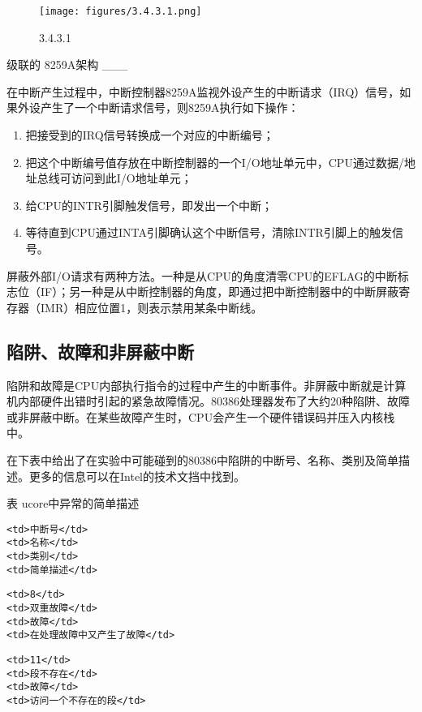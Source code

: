 \begin{figure}[htbp]
\centering
\texttt{[image: figures/3.4.3.1.png]}
\caption{3.4.3.1}
\end{figure}

级联的 8259A架构 \_\_\_

在中断产生过程中，中断控制器8259A监视外设产生的中断请求（IRQ）信号，如果外设产生了一个中断请求信号，则8259A执行如下操作：

\begin{enumerate}
\def\labelenumi{\arabic{enumi}.}
\item
  把接受到的IRQ信号转换成一个对应的中断编号；
\item
  把这个中断编号值存放在中断控制器的一个I/O地址单元中，CPU通过数据/地址总线可访问到此I/O地址单元；
\item
  给CPU的INTR引脚触发信号，即发出一个中断；
\item
  等待直到CPU通过INTA引脚确认这个中断信号，清除INTR引脚上的触发信号。
\end{enumerate}

屏蔽外部I/O请求有两种方法。一种是从CPU的角度清零CPU的EFLAG的中断标志位（IF）；另一种是从中断控制器的角度，即通过把中断控制器中的中断屏蔽寄存器（IMR）相应位置1，则表示禁用某条中断线。

\subsection{陷阱、故障和非屏蔽中断}\label{ux9677ux9631ux6545ux969cux548cux975eux5c4fux853dux4e2dux65ad}

陷阱和故障是CPU内部执行指令的过程中产生的中断事件。非屏蔽中断就是计算机内部硬件出错时引起的紧急故障情况。80386处理器发布了大约20种陷阱、故障或非屏蔽中断。在某些故障产生时，CPU会产生一个硬件错误码并压入内核栈中。

在下表中给出了在实验中可能碰到的80386中陷阱的中断号、名称、类别及简单描述。更多的信息可以在Intel的技术文挡中找到。

表 ucore中异常的简单描述

\begin{lstlisting}
<td>中断号</td>
<td>名称</td>
<td>类别</td>
<td>简单描述</td>
\end{lstlisting}

\begin{lstlisting}
<td>8</td>
<td>双重故障</td>
<td>故障</td>
<td>在处理故障中又产生了故障</td>
\end{lstlisting}

\begin{lstlisting}
<td>11</td>
<td>段不存在</td>
<td>故障</td>
<td>访问一个不存在的段</td>
\end{lstlisting}


